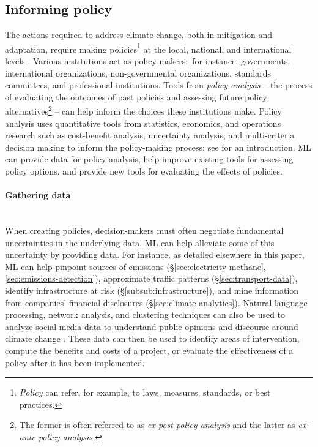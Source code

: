 \documentclass[11pt]{report}
\newcommand{\Gap}{\texorpdfstring{\hfill}{}}
\newcommand{\Rec}{\texorpdfstring{{\small\emph{\color{blue}{\fbox{High Leverage}}}}}{}}
\begin{document}
\subsection{Informing policy}
\label{sec:decisionmaking}

The actions required to address climate change, both in mitigation and adaptation, require making policies\footnote{\emph{Policy} can refer, for example, to laws, measures, standards, or best practices.} at the local, national, and international levels \cite{sterner2019}. Various institutions act as policy-makers:~for instance, governments, international organizations, non-governmental organizations, standards committees, and professional institutions.  Tools from \emph{policy analysis} -- the process of evaluating the outcomes of past policies and assessing future policy alternatives\footnote{The former is often referred to as \textit{ex-post policy analysis} and the latter as \textit{ex-ante policy analysis}.} -- can help inform the choices these institutions make.
Policy analysis uses quantitative tools from statistics, economics, and operations research such as cost-benefit analysis, uncertainty analysis, and multi-criteria decision making to inform the policy-making process; see \cite{morgan_2017, patton2015policy} for an introduction.
ML can provide data for policy analysis, help improve existing tools for assessing policy options, and provide new tools for evaluating the effects of policies.

\paragraph*{Gathering data}\Gap\mbox{\Rec}\\
When creating policies, decision-makers must often negotiate fundamental uncertainties in the underlying data.
ML can help alleviate some of this uncertainty by providing data. For instance, as detailed elsewhere in this paper, ML can help pinpoint sources of emissions (\S\ref{sec:electricity-methane},\ref{sec:emissions-detection}), approximate traffic patterns (\S\ref{sec:transport-data}), identify infrastructure at risk (\S\ref{subsub:infrastructure}), and mine information from companies' financial disclosures (\S\ref{sec:climate-analytics}).
Natural language processing, network analysis, and clustering techniques can also be used to analyze social media data to understand public opinions and discourse around climate change \cite{veltri2017climate, williams2015network, kirilenko2014public}.
These data can then be used to identify areas of intervention, compute the benefits and costs of a project, or evaluate the effectiveness of a policy after it has been implemented. 
\end{document}
